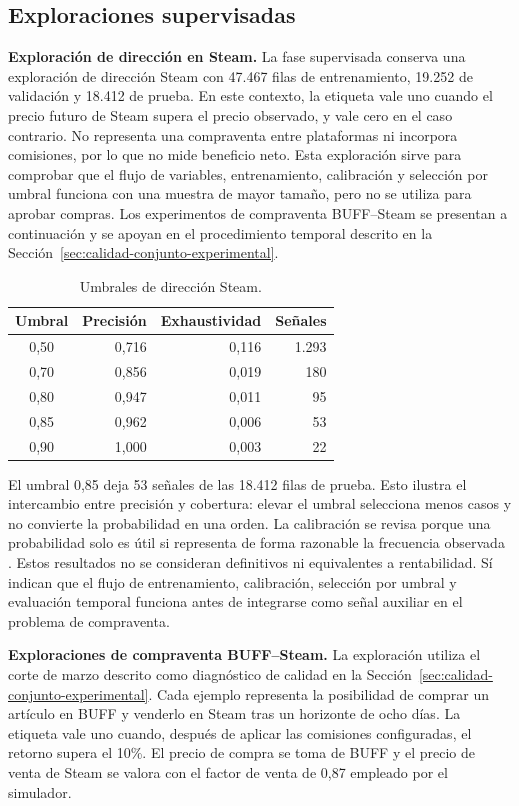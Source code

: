 \subsection{Exploraciones supervisadas}

\textbf{Exploración de dirección en Steam.} La fase supervisada conserva una exploración de dirección Steam con 47.467 filas de entrenamiento, 19.252 de validación y 18.412 de prueba. En este contexto, la etiqueta vale uno cuando el precio futuro de Steam supera el precio observado, y vale cero en el caso contrario. No representa una compraventa entre plataformas ni incorpora comisiones, por lo que no mide beneficio neto. Esta exploración sirve para comprobar que el flujo de variables, entrenamiento, calibración y selección por umbral funciona con una muestra de mayor tamaño, pero no se utiliza para aprobar compras. Los experimentos de compraventa BUFF--Steam se presentan a continuación y se apoyan en el procedimiento temporal descrito en la Sección~\ref{sec:calidad-conjunto-experimental}.

\begin{table}[h]
\centering
\begin{tabular}{c r r r}
\toprule
Umbral & Precisión & Exhaustividad & Señales \\
\midrule
0,50 & 0,716 & 0,116 & 1.293 \\
0,70 & 0,856 & 0,019 & 180 \\
0,80 & 0,947 & 0,011 & 95 \\
0,85 & 0,962 & 0,006 & 53 \\
0,90 & 1,000 & 0,003 & 22 \\
\bottomrule
\end{tabular}
\caption{Umbrales de dirección Steam.}
\label{tab:umbrales-direccion-steam}
\end{table}

El umbral 0,85 deja 53 señales de las 18.412 filas de prueba. Esto ilustra el intercambio entre precisión y cobertura: elevar el umbral selecciona menos casos y no convierte la probabilidad en una orden. La calibración se revisa porque una probabilidad solo es útil si representa de forma razonable la frecuencia observada \cite{niculescu2005predicting,guo2017calibration}. Estos resultados no se consideran definitivos ni equivalentes a rentabilidad. Sí indican que el flujo de entrenamiento, calibración, selección por umbral y evaluación temporal funciona antes de integrarse como señal auxiliar en el problema de compraventa.

\textbf{Exploraciones de compraventa BUFF--Steam.} La exploración utiliza el corte de marzo descrito como diagnóstico de calidad en la Sección~\ref{sec:calidad-conjunto-experimental}. Cada ejemplo representa la posibilidad de comprar un artículo en BUFF y venderlo en Steam tras un horizonte de ocho días. La etiqueta vale uno cuando, después de aplicar las comisiones configuradas, el retorno supera el 10\%. El precio de compra se toma de BUFF y el precio de venta de Steam se valora con el factor de venta de 0,87 empleado por el simulador.

